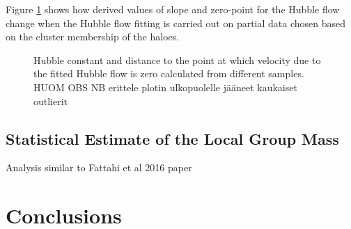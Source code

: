 \documentclass[english, oneside]{HYgradu}
\begin{document}
\reversemarginpar
{}
Figure \ref{fig:clusteredHFparameters} shows how derived values of slope and zero-point for the Hubble flow change when the Hubble flow fitting is carried out on partial data chosen based on the cluster membership of the haloes.

\begin{figure}
    \centering
    
    \caption{Hubble constant and distance to the point at which velocity due to the fitted Hubble flow is zero calculated from different samples. HUOM OBS NB erittele plotin ulkopuolelle jääneet kaukaiset outlierit}\label{fig:clusteredHFparameters}
\end{figure}

\section{Statistical Estimate of the Local Group Mass}
Analysis similar to Fattahi et al 2016 paper



%
%

\chapter{Conclusions}






\clearpage
{} %


\end{document}
